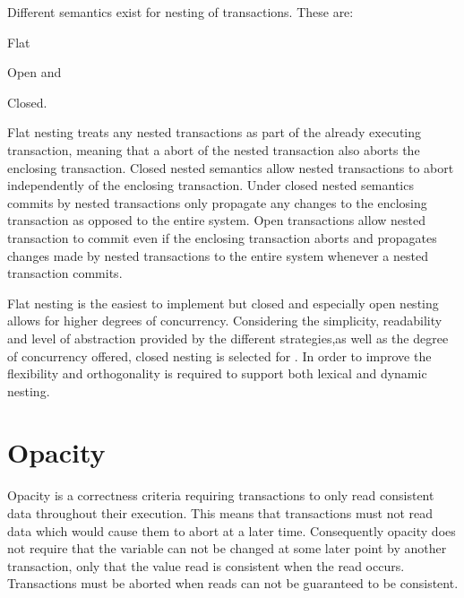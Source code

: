 Different semantics exist for nesting of transactions. These are:  \begin{inparaenum}
\item Flat
\item Open and 
\item Closed\cite[p. 1]{kumar2011hparstm}\cite[p. 42]{harris2010transactional}.
\end{inparaenum}
Flat nesting treats any nested transactions as part of the already executing transaction, meaning that a abort of the nested transaction also aborts the enclosing transaction. Closed nested semantics allow nested transactions to abort independently of the enclosing transaction. Under closed nested semantics commits by nested transactions only propagate any changes to the enclosing transaction as opposed to the entire system. Open transactions allow nested transaction to commit even if the enclosing transaction aborts and propagates changes made by nested transactions to the entire system whenever a nested transaction commits.

Flat nesting is the easiest to implement but closed and especially open nesting allows for higher degrees of concurrency\cite[p. 43]{harris2010transactional}. Considering the simplicity, readability and level of abstraction provided by the different strategies,as well as the degree of concurrency offered, closed nesting is selected for \stmnamesp. In order to improve the flexibility and orthogonality \stmnamesp is required to support both lexical and dynamic nesting.


\section{Opacity}
Opacity is a correctness criteria requiring transactions to only read consistent data throughout their execution\cite[p. 1]{guerraoui2007opacity}\cite[p. 29]{harris2010transactional}. This means that transactions must not read data which would cause them to abort at a later time. Consequently opacity does not require that the variable can not be changed at some later point by another transaction, only that the value read is consistent when the read occurs. Transactions must be aborted when reads can not be guaranteed to be consistent.

